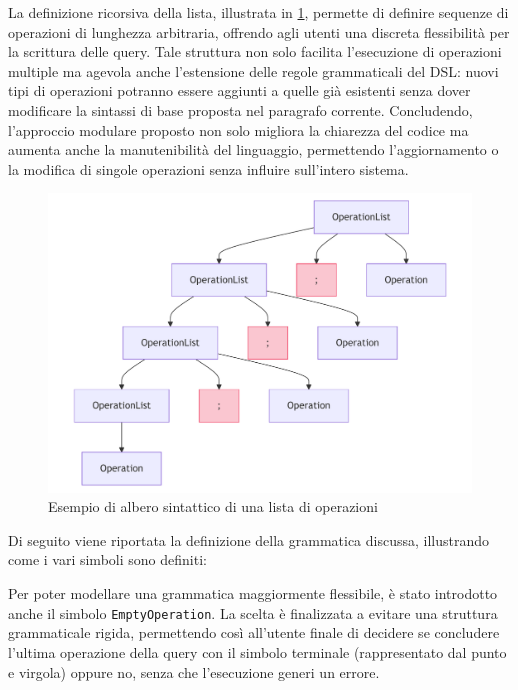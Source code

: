 \documentclass[12pt,a4paper,openright,twoside]{book}
\begin{document}
La definizione ricorsiva della lista, illustrata in \cref{fig:list-ast}, permette di definire sequenze di operazioni di lunghezza 
arbitraria, offrendo agli utenti una discreta flessibilità per la scrittura delle query. Tale struttura non solo facilita 
l’esecuzione di operazioni multiple ma agevola anche l'estensione delle regole grammaticali del DSL: nuovi tipi di operazioni 
potranno essere aggiunti a quelle già esistenti senza dover modificare la sintassi di base proposta nel paragrafo corrente. 
Concludendo, l'approccio modulare proposto non solo migliora la chiarezza del codice ma aumenta anche la manutenibilità del 
linguaggio, permettendo l’aggiornamento o la modifica di singole operazioni senza influire sull’intero sistema.

\begin{figure}[H]
    \centering
    \includegraphics[width=.8\linewidth]{figures/list-ast.pdf}
    \caption{Esempio di albero sintattico di una lista di operazioni}
    \label{fig:list-ast}
\end{figure}

Di seguito viene riportata la definizione della grammatica discussa, illustrando come i vari simboli sono definiti:

Per poter modellare una grammatica maggiormente flessibile, è stato introdotto anche il simbolo \texttt{EmptyOperation}. La scelta 
è finalizzata a evitare una struttura grammaticale rigida, permettendo così all’utente finale di decidere se concludere l’ultima 
operazione della query con il simbolo terminale (rappresentato dal punto e virgola) oppure no, senza che l’esecuzione generi un 
errore.
\end{document}
